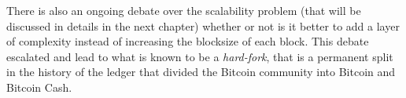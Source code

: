 		There is also an ongoing debate over the scalability problem (that will be discussed in details in the next chapter) whether or not is it better to add a layer of complexity instead of increasing the blocksize of each block. This debate escalated and lead to what is known to be a \textit{hard-fork}, that is a  permanent split in the history of the ledger that divided the Bitcoin community into Bitcoin and Bitcoin Cash.

